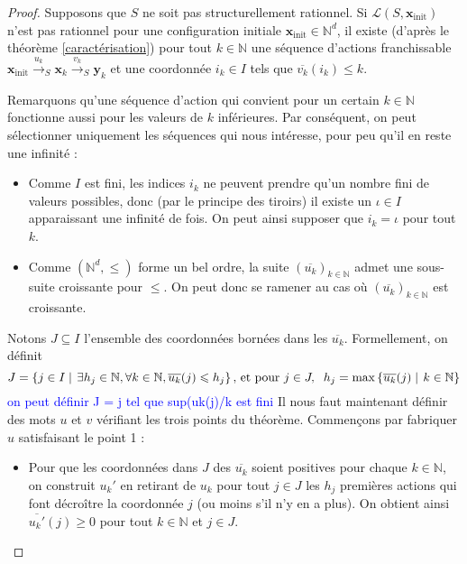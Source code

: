 \documentclass[a4paper,final]{article}
\theoremstyle{definition}
\let\leq\leqslant
\let\geq\geqslant
\newcommand{\alain}[1]{\textcolor{blue}{#1}}
\newcommand{\set}[2]{\left\{#1\mathrel{\left|\vphantom{#1}\vphantom{#2}\right.}#2\right\}}
\newcommand{\N}{\ensuremath{\mathbb{N}}}
\newcommand{\lang}{\ensuremath{\mathcal{L}}}
\newcommand{\trans}[2]{\ensuremath{\stackrel{#1}{\longrightarrow}_{#2}}}
\newcommand{\vect}[1]{\ensuremath{\mathbf{#1}}}
\newcommand{\xinit}{\ensuremath{\vect{x}_\text{init}}}
\newcommand{\valeur}[1]{\ensuremath{\overline{#1}}}
\begin{document}
\begin{proof}
Supposons que $S$ ne soit pas structurellement rationnel.
Si $\lang(S,\xinit)$ n'est pas rationnel pour une configuration initiale $\xinit \in\N^d$, il existe (d'après le théorème \ref{caractérisation}) pour tout $k\in\N$ une séquence d'actions franchissable 
$\xinit \trans{u_k}{S} \vect{x}_k \trans{v_k}{S} \vect{y}_k$
et une coordonnée $i_k \in I$ tels que $\valeur{v_k}(i_k) \leq k$.

Remarquons qu'une séquence d'action qui convient pour un certain $k\in\N$ fonctionne aussi pour les valeurs de $k$ inférieures.
Par conséquent, on peut sélectionner uniquement les séquences qui nous intéresse, pour peu qu'il  en reste une infinité :

\begin{itemize}
    \item Comme $I$ est fini, les indices $i_k$ ne peuvent prendre qu'un nombre fini de valeurs possibles, donc (par le principe des tiroirs) il existe un $\iota\in I$ apparaissant une infinité de fois.
    On peut ainsi supposer que $i_k = \iota$ pour tout $k$.
    
    \item Comme $(\N^d,\leq)$ forme un bel ordre, la suite $(\valeur{u_k})_{k\in\N}$ admet une sous-suite croissante pour $\leq$.
    On peut donc se ramener au cas où $(\valeur{u_k})_{k\in\N}$ est croissante.
\end{itemize}

Notons $J\subseteq I$ l'ensemble des coordonnées bornées dans les $\valeur{u_k}$.
Formellement, on définit 
$$J = \set{j\in I}{\exists h_j\in\N, \forall k\in\N, \valeur{u_k}(j) \leq h_j}
\text{, et pour } j\in J,\hspace{2mm} h_j = \max \set{\valeur{u_k}(j)}{k\in\N}$$
\alain{on peut définir J = j tel que sup{(uk(j)/k} est fini }
Il nous faut maintenant définir des mots $u$ et $v$ vérifiant les trois points du théorème.
Commençons par fabriquer $u$ satisfaisant le point 1 :
\begin{itemize}
    \item Pour que les coordonnées dans $J$ des $\valeur{u_k}$ soient positives pour chaque $k\in\N$, 
    on construit $u_k'$ en retirant de $u_k$ pour tout $j\in J$ les $h_j$ premières actions qui font décroître la coordonnée $j$ (ou moins s'il n'y en a plus).
    On obtient ainsi $\valeur{u_k'}(j) \geq 0$ pour tout $k\in\N$ et $j\in J$.
    

\end{itemize}
\end{proof}
\end{document}
